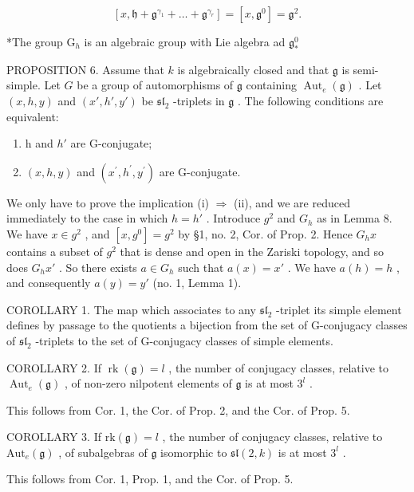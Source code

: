 \[
[ x, \mathfrak {h} + \mathfrak {g} ^ {\gamma_ {1}} + \dots + \mathfrak {g} ^ {\gamma_ {r}} ] = [ x, \mathfrak {g} ^ {0} ] = \mathfrak {g} ^ {2}.\tag{Q.E.D.}
\]

*The group \(\mathrm{G}_h\) is an algebraic group with Lie algebra ad \(\mathfrak{g}^0_*\)

PROPOSITION 6. Assume that \(k\) is algebraically closed and that \(\mathfrak{g}\) is semi-simple. Let \(G\) be a group of automorphisms of \(\mathfrak{g}\) containing \(\operatorname{Aut}_e(\mathfrak{g})\) . Let \((x, h, y)\) and \((x', h', y')\) be \(\mathfrak{sl}_2\) -triplets in \(\mathfrak{g}\) . The following conditions are equivalent:

\begin{enumerate}
\def\labelenumi{(\roman{enumi})}
\item
  h and \(h'\) are G-conjugate;
\item
  \((x,h,y)\) and \((x^{\prime},h^{\prime},y^{\prime})\) are G-conjugate.
\end{enumerate}

We only have to prove the implication (i) \(\Longrightarrow\) (ii), and we are reduced immediately to the case in which \(h = h'\) . Introduce \(g^{2}\) and \(G_{h}\) as in Lemma 8. We have \(x \in g^{2}\) , and \([x, g^{0}] = g^{2}\) by §1, no. 2, Cor. of Prop. 2. Hence \(G_{h}x\) contains a subset of \(g^{2}\) that is dense and open in the Zariski topology, and so does \(G_{h}x'\) . So there exists \(a \in G_{h}\) such that \(a(x) = x'\) . We have \(a(h) = h\) , and consequently \(a(y) = y'\) (no. 1, Lemma 1).

COROLLARY 1. The map which associates to any \(\mathfrak{sl}_2\) -triplet its simple element defines by passage to the quotients a bijection from the set of G-conjugacy classes of \(\mathfrak{sl}_2\) -triplets to the set of G-conjugacy classes of simple elements.

COROLLARY 2. If \(\operatorname{rk}(\mathfrak{g}) = l\) , the number of conjugacy classes, relative to \(\operatorname{Aut}_e(\mathfrak{g})\) , of non-zero nilpotent elements of \(\mathfrak{g}\) is at most \(3^l\) .

This follows from Cor. 1, the Cor. of Prop. 2, and the Cor. of Prop. 5.

COROLLARY 3. If \(\mathrm{rk}(\mathfrak{g}) = l\) , the number of conjugacy classes, relative to \(\mathrm{Aut}_e(\mathfrak{g})\) , of subalgebras of \(\mathfrak{g}\) isomorphic to \(\mathfrak{sl}(2,k)\) is at most \(3^l\) .

This follows from Cor. 1, Prop. 1, and the Cor. of Prop. 5.

